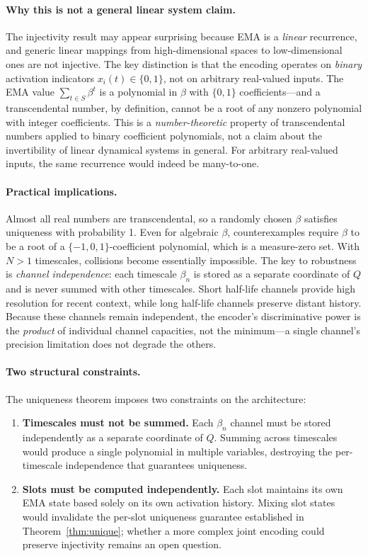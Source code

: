 \documentclass[11pt]{article}
\begin{document}
\paragraph{Why this is not a general linear system claim.}
The injectivity result may appear surprising because EMA is a \emph{linear} recurrence, and generic linear mappings from high-dimensional spaces to low-dimensional ones are not injective. The key distinction is that the encoding operates on \emph{binary} activation indicators $x_i(t) \in \{0, 1\}$, not on arbitrary real-valued inputs. The EMA value $\sum_{t \in S} \beta^t$ is a polynomial in $\beta$ with $\{0,1\}$ coefficients---and a transcendental number, by definition, cannot be a root of any nonzero polynomial with integer coefficients. This is a \emph{number-theoretic} property of transcendental numbers applied to binary coefficient polynomials, not a claim about the invertibility of linear dynamical systems in general. For arbitrary real-valued inputs, the same recurrence would indeed be many-to-one.

\paragraph{Practical implications.}
Almost all real numbers are transcendental, so a randomly chosen $\beta$ satisfies uniqueness with probability 1. Even for algebraic $\beta$, counterexamples require $\beta$ to be a root of a $\{-1,0,1\}$-coefficient polynomial, which is a measure-zero set. With $N > 1$ timescales, collisions become essentially impossible. The key to robustness is \emph{channel independence}: each timescale $\beta_n$ is stored as a separate coordinate of $Q$ and is never summed with other timescales. Short half-life channels provide high resolution for recent context, while long half-life channels preserve distant history. Because these channels remain independent, the encoder's discriminative power is the \emph{product} of individual channel capacities, not the minimum---a single channel's precision limitation does not degrade the others.

\paragraph{Two structural constraints.}
The uniqueness theorem imposes two constraints on the architecture:
\begin{enumerate}[leftmargin=1.5em]
    \item \textbf{Timescales must not be summed.} Each $\beta_n$ channel must be stored independently as a separate coordinate of $Q$. Summing across timescales would produce a single polynomial in multiple variables, destroying the per-timescale independence that guarantees uniqueness.
    \item \textbf{Slots must be computed independently.} Each slot maintains its own EMA state based solely on its own activation history. Mixing slot states would invalidate the per-slot uniqueness guarantee established in Theorem~\ref{thm:unique}; whether a more complex joint encoding could preserve injectivity remains an open question.
\end{enumerate}
\end{document}

